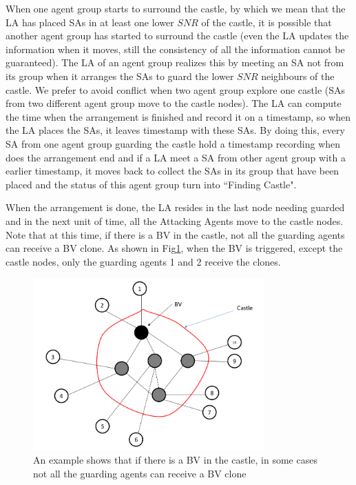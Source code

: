 When one agent group starts to surround the castle, by which we mean that the LA has placed SAs in at least one lower $SNR$ of the castle, it is possible that another agent group has started to surround the castle (even the LA updates the information when it moves, still the consistency of all the information cannot be guaranteed). The LA of an agent group realizes this by meeting an SA not from its group when it arranges the SAs to guard the lower $SNR$ neighbours of the castle. We prefer to avoid conflict when two agent group explore one castle (SAs from two different agent group move to the castle nodes). The LA can compute the time when the arrangement is finished and record it on a timestamp, so when the LA places the SAs, it leaves timestamp with these SAs. By doing this, every SA from one agent group guarding the castle hold a timestamp recording when does the arrangement end and if a LA meet a SA from other agent group with a earlier timestamp, it moves back to collect the SAs in its group that have been placed and the status of this agent group turn into ``Finding Castle". 

When the arrangement is done, the LA resides in the last node needing guarded and in the next unit of time, all the Attacking Agents move to the castle nodes. Note that at this time, if there is a BV in the castle, not all the guarding agents can receive a BV clone. As shown in Fig\ref{fig:MultiCastleNode}, when the BV is triggered, except the castle nodes, only the guarding agents 1 and 2 receive the clones.
\begin{figure}[H]
\centering  
\includegraphics[width=3.5in]{figures/MultiCastleNode.png}
\caption{An example shows that if there is a BV in the castle, in some cases not all the guarding agents can receive a BV clone}\label{fig:MultiCastleNode}
\end{figure} 

